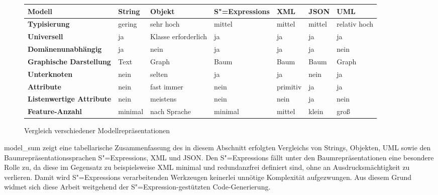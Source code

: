 \documentclass[12pt, a4paper, bibgerm]{scrbook}
\newcommand\abb{}
\newcommand{\sexp}{S"=Expression}
\newcommand{\sexps}{S"=Expressions}
\begin{document}
\begin{figure}
  \centering
\begin{tabular}{|l|l|l|l|l|l|l|}\hline
\bf Modell                        & \bf String & \bf Objekt           & \bf \sexps{}    & \bf XML  & \bf JSON & \bf UML         \\\hline\hline
\bf Typisierung                   & gering     & sehr hoch            & mittel          & mittel   & mittel   & relativ hoch    \\\hline
\bf Universell                    & ja         & Klasse erforderlich  & ja              & ja       & ja       & ja              \\\hline
\bf Domänenunabhängig             & ja         & nein                 & ja              & ja       & ja       & nein            \\\hline
\bf Graphische Darstellung        & Text       & Graph                & Baum            & Baum     & Baum     & Graph           \\\hline
\bf Unterknoten                   & nein       & selten               & ja              & ja       & nein     & ja              \\\hline
\bf Attribute                     & nein       & fast immer           & nein            & primitiv & ja       & ja              \\\hline
\bf Listenwertige Attribute       & nein       & meistens             & nein            & nein     & ja       & nein            \\\hline
\bf Feature-Anzahl                & minimal    & nach Sprache         & minimal         & mittel   & klein    & groß            \\\hline
\end{tabular}
  \caption{Vergleich verschiedener Modellrepräsentationen}
  \label{magicl:fig:model_sum}
\end{figure}

\abb{model_sum} zeigt eine tabellarische Zusammenfassung des in diesem
Abschnitt erfolgten Vergleichs von Strings, Objekten, UML sowie den
Baumrepräsentationssprachen \sexps{}, XML und JSON. Den \sexps{} fällt
unter den Baumrepräsentationen eine besondere Rolle zu, da diese im
Gegensatz zu beispielsweise XML minimal und redundanzfrei definiert
sind, ohne an Ausdrucksmächtigkeit zu verlieren. Damit wird \sexps{}
verarbeitenden Werkzeugen keinerlei unnötige Komplexität
aufgezwungen. Aus diesem Grund widmet sich diese Arbeit weitgehend der
\sexp-gestützten Code-Generierung.
\end{document}
